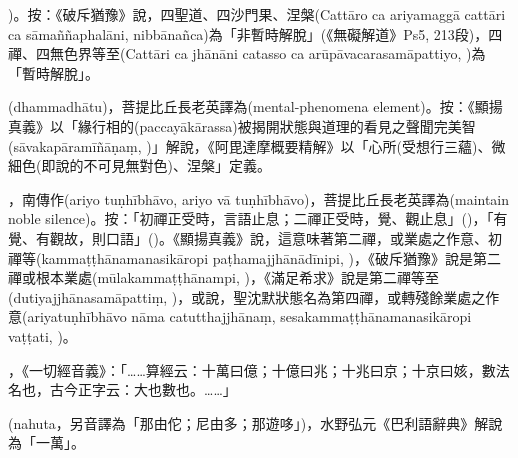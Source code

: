 \startitemgroup[noteitems]
\item{})。按：《破斥猶豫》說，四聖道、四沙門果、涅槃(Cattāro ca ariyamaggā cattāri ca sāmaññaphalāni, nibbānañca)為「非暫時解脫」(《無礙解道》Ps5, 213段)，四禪、四無色界等至(Cattāri ca jhānāni catasso ca arūpāvacarasamāpattiyo, )為「暫時解脫」。
\stopitemgroup

\startitemgroup[noteitems]
\item{}(dhammadhātu)，菩提比丘長老英譯為(mental-phenomena element)。按：《顯揚真義》以「緣行相的(paccayākārassa)被揭開狀態與道理的看見之聲聞完美智(sāvakapāramīñāṇaṃ, )」解說，《阿毘達摩概要精解》以「心所(受想行三蘊)、微細色(即說的不可見無對色)、涅槃」定義。
\stopitemgroup

\startitemgroup[noteitems]
\item{}，南傳作(ariyo tuṇhībhāvo, ariyo vā tuṇhībhāvo)，菩提比丘長老英譯為(maintain noble silence)。按：「初禪正受時，言語止息；二禪正受時，覺、觀止息」()，「有覺、有觀故，則口語」()。《顯揚真義》說，這意味著第二禪，或業處之作意、初禪等(kammaṭṭhānamanasikāropi paṭhamajjhānādīnipi, )，《破斥猶豫》說是第二禪或根本業處(mūlakammaṭṭhānampi, )，《滿足希求》說是第二禪等至(dutiyajjhānasamāpattiṃ, )，或說，聖沈默狀態名為第四禪，或轉殘餘業處之作意(ariyatuṇhībhāvo nāma catutthajjhānaṃ, sesakammaṭṭhānamanasikāropi vaṭṭati, )。
\stopitemgroup

\startitemgroup[noteitems]
\item{}，《一切經音義》：「……算經云：十萬曰億；十億曰兆；十兆曰京；十京曰姟，數法名也，古今正字云：大也數也。……」
\item{}(nahuta，另音譯為「那由佗；尼由多；那遊哆」)，水野弘元《巴利語辭典》解說為「一萬」。
\stopitemgroup


